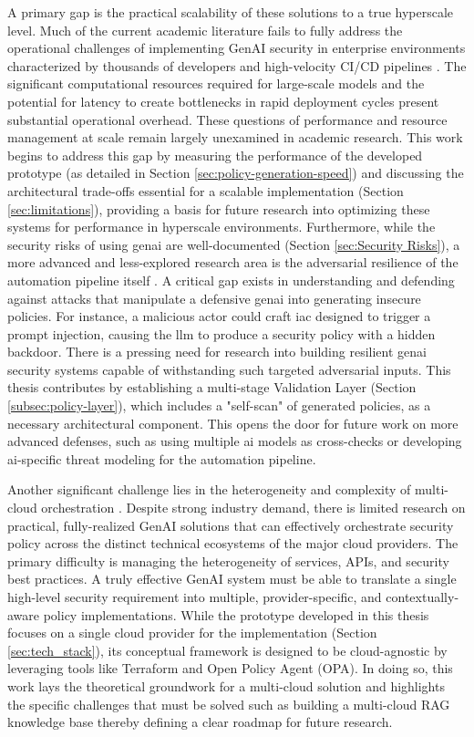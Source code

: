 A primary gap is the practical scalability of these solutions to a true hyperscale level. Much of the current academic literature fails to fully address the operational challenges of implementing GenAI security in enterprise environments characterized by thousands of developers and high-velocity CI/CD pipelines \cite{fu_ai_2025}. The significant computational resources required for large-scale models and the potential for latency to create bottlenecks in rapid deployment cycles present substantial operational overhead. These questions of performance and resource management at scale remain largely unexamined in academic research. This work begins to address this gap by measuring the performance of the developed prototype (as detailed in Section \ref{sec:policy-generation-speed}) and discussing the architectural trade-offs essential for a scalable implementation (Section \ref{sec:limitations}), providing a basis for future research into optimizing these systems for performance in hyperscale environments.
Furthermore, while the security risks of using \gls{genai} are well-documented (Section \ref{sec:Security Risks}), a more advanced and less-explored research area is the adversarial resilience of the automation pipeline itself \cite{nyoto_cyber_2024,dash_zero-trust_2024}. A critical gap exists in understanding and defending against attacks that manipulate a defensive \gls{genai} into generating insecure policies. For instance, a malicious actor could craft \gls{iac} designed to trigger a prompt injection, causing the \gls{llm} to produce a security policy with a hidden backdoor. There is a pressing need for research into building resilient \gls{genai} security systems capable of withstanding such targeted adversarial inputs. This thesis contributes by establishing a multi-stage Validation Layer (Section \ref{subsec:policy-layer}), which includes a "self-scan" of generated policies, as a necessary architectural component. This opens the door for future work on more advanced defenses, such as using multiple \gls{ai} models as cross-checks or developing \gls{ai}-specific threat modeling for the automation pipeline.

Another significant challenge lies in the heterogeneity and complexity of multi-cloud orchestration \cite{seth_ai_2025-1,bringhenti_security_2023-1}. Despite strong industry demand, there is limited research on practical, fully-realized GenAI solutions that can effectively orchestrate security policy across the distinct technical ecosystems of the major cloud providers. The primary difficulty is managing the heterogeneity of services, APIs, and security best practices. A truly effective GenAI system must be able to translate a single high-level security requirement into multiple, provider-specific, and contextually-aware policy implementations. While the prototype developed in this thesis focuses on a single cloud provider for the implementation (Section \ref{sec:tech_stack}), its conceptual framework is designed to be cloud-agnostic by leveraging tools like Terraform and Open Policy Agent (OPA). In doing so, this work lays the theoretical groundwork for a multi-cloud solution and highlights the specific challenges that must be solved such as building a multi-cloud RAG knowledge base thereby defining a clear roadmap for future research.

